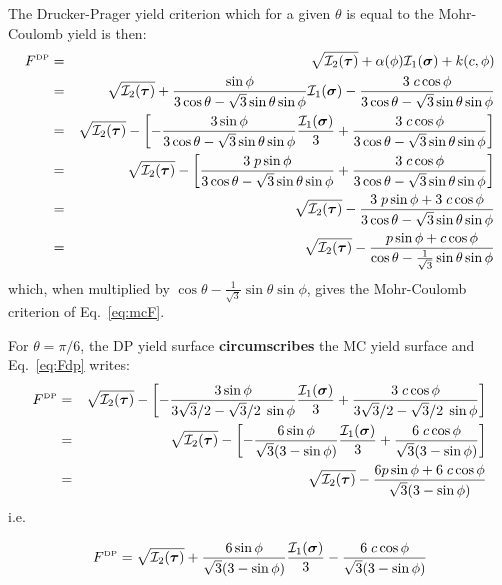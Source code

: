 The Drucker-Prager yield criterion which for a given $\theta$ is equal to the Mohr-Coulomb yield is then:
\begin{eqnarray}
F^{\text{\tiny DP}}
&=& \sqrt{{\cal I}_2({\bm \tau})} + \alpha(\phi) {\cal I}_1({\bm \sigma}) + k(c,\phi)  \nonumber\\
&=& \sqrt{{\cal I}_2({\bm \tau})} 
+ \frac{\sin\phi}{ 3 \cos\theta - \sqrt{3}\sin\theta \sin\phi}  {\cal I}_1({\bm \sigma})  
- \frac{ 3\; c \cos \phi }{ 3 \cos\theta - \sqrt{3}\sin\theta \sin\phi} \nonumber\\
&=& \sqrt{{\cal I}_2({\bm \tau})} 
- \left[ -\frac{3 \sin\phi}{ 3 \cos\theta - \sqrt{3}\sin\theta \sin\phi}  \frac{{\cal I}_1({\bm \sigma})}{3}
+ \frac{ 3\; c \cos \phi }{ 3 \cos\theta - \sqrt{3}\sin\theta \sin\phi} \right] \label{eq:Fdp}\\
&=& \sqrt{{\cal I}_2({\bm \tau})} 
- \left[ \frac{3\; p \sin\phi}{ 3 \cos\theta - \sqrt{3}\sin\theta \sin\phi} 
+ \frac{ 3\; c \cos \phi }{ 3 \cos\theta - \sqrt{3}\sin\theta \sin\phi} \right] \nonumber\\
&=& \sqrt{{\cal I}_2({\bm \tau})}  
- \frac{3\; p \sin\phi  + 3\; c \cos \phi }{ 3 \cos\theta - \sqrt{3}\sin\theta \sin\phi} \nonumber\\ 
&=& \sqrt{{\cal I}_2({\bm \tau})}  
- \frac{p \sin\phi  + c \cos \phi }{  \cos\theta - \frac{1}{\sqrt{3}}\sin\theta \sin\phi} 
\end{eqnarray}
which, when multiplied by $\cos\theta - \frac{1}{\sqrt{3}}\sin\theta \sin\phi$, gives
the Mohr-Coulomb criterion of Eq.~\eqref{eq:mcF}. 

For $\theta=\pi/6$, the DP yield surface {\bf circumscribes} the MC yield 
surface and Eq.~\eqref{eq:Fdp} writes:
\begin{eqnarray}
F^{\text{\tiny DP}}
&=& \sqrt{{\cal I}_2({\bm \tau})} 
- \left[ -\frac{3 \sin\phi}{ 3 \sqrt{3}/2 - \sqrt{3}/2 \; \sin\phi}  \frac{{\cal I}_1({\bm \sigma})}{3}
+ \frac{ 3\; c \cos \phi }{ 3 \sqrt{3}/2 - \sqrt{3}/2 \; \sin\phi} \right] \nonumber\\
&=& \sqrt{{\cal I}_2({\bm \tau})} 
- \left[ -\frac{6 \sin\phi}{\sqrt{3} (3 - \sin\phi) }  \frac{{\cal I}_1({\bm \sigma})}{3}
+ \frac{ 6\; c \cos \phi }{ \sqrt{3}(3 - \sin\phi)} \right] \nonumber\\
&=& \sqrt{{\cal I}_2({\bm \tau})} 
- \frac{ 6 p \sin \phi + 6\; c \cos \phi }{ \sqrt{3}(3 - \sin\phi)} \label{eq:dpc}
\end{eqnarray}
i.e.

\begin{mdframed}[backgroundcolor=blue!5]
\begin{equation}
F^{\text{\tiny DP}}
= \sqrt{{\cal I}_2({\bm \tau})} 
+ \frac{ 6 \sin \phi }{ \sqrt{3}(3 - \sin\phi)} \frac{{\cal I}_1({\bm\sigma})}{3}
- \frac{ 6\; c \cos \phi }{ \sqrt{3}(3 - \sin\phi)} 
\end{equation}
\end{mdframed}

